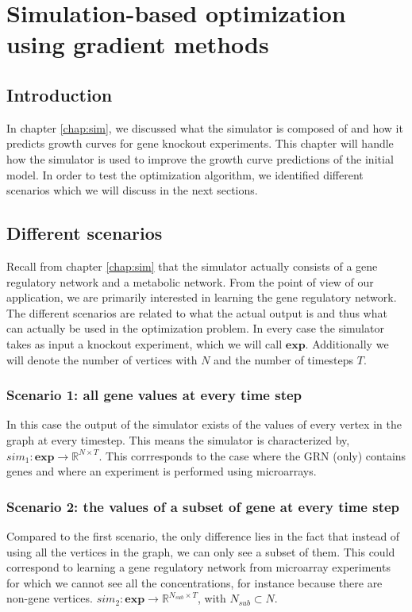 \chapter{Simulation-based optimization using gradient methods}
\section{Introduction}
In chapter \ref{chap:sim}, we discussed what the simulator is composed of and how it predicts growth curves for gene knockout experiments. This chapter will handle how
the simulator is used to improve the growth curve predictions of the initial model. In order to test the optimization algorithm, we identified different scenarios which we will 
discuss in the next sections. 
\section{Different scenarios}
Recall from chapter \ref{chap:sim} that the simulator actually consists of a gene regulatory network and a metabolic network. From the point of view of our application,
we are primarily interested in learning the gene regulatory network. The different scenarios are related to what the actual output is and thus what can actually be used
in the optimization problem. In every case the simulator takes as input a knockout experiment, which we will call $\mathbf{exp}$. Additionally we will denote the number of
vertices with $N$ and the number of timesteps $T$.
\subsection{Scenario 1: all gene values at every time step}
In this case the output of the simulator exists of the values of every vertex in the graph at every timestep.
This means the simulator is characterized by, $sim_{1}: \mathbf{exp} \to \mathbb{R}^{N \times T}$. This corrresponds to the case where the GRN (only) contains genes and
where an experiment is performed using microarrays.
\subsection{Scenario 2: the values of a subset of gene at every time step}
Compared to the first scenario, the only difference lies in the fact that instead of using all the vertices in the graph, we can only see a subset of them. This could correspond
to learning a gene regulatory network from microarray experiments for which we cannot see all the concentrations, for instance because there are non-gene vertices.
$sim_{2}: \mathbf{exp} \to \mathbb{R}^{N_{sub} \times T}$, with $N_{sub} \subset N$.
